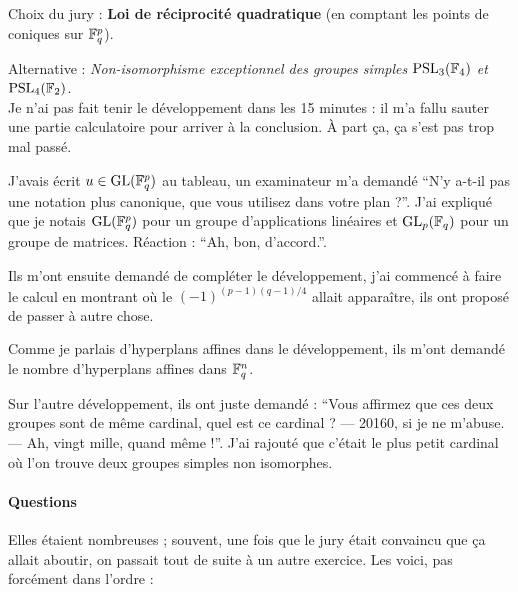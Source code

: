 \documentclass[a4paper, 11pt]{article}
\begin{document}
Choix du jury : \textbf{Loi de réciprocité quadratique} (en comptant les points de
coniques sur $\mathbb{F}_q^p$).

Alternative : \emph{Non-isomorphisme exceptionnel des groupes simples
  $\mathrm{PSL}_3(\mathbb{F}_4)$ et $\mathrm{PSL}_4(\mathbb{F}_2)$}.\\

Je n'ai pas fait tenir le développement dans les 15 minutes : il m'a fallu
sauter une partie calculatoire pour arriver à la conclusion. À part ça, ça s'est
pas trop mal passé.

J'avais écrit $u \in \mathrm{GL}(\mathbb{F}_q^p)$ au tableau, un examinateur m'a demandé
\enquote{N'y a-t-il pas une notation plus canonique, que vous utilisez dans
  votre plan ?}. J'ai expliqué que je notais $\mathrm{GL}(\mathbb{F}_q^p)$ pour un groupe
d'applications linéaires et $\mathrm{GL}_p(\mathbb{F}_q)$ pour un groupe de matrices. Réaction :
\enquote{Ah, bon, d'accord.}.

Ils m'ont ensuite demandé de compléter le développement, j'ai commencé à
faire le calcul en montrant où le $(-1)^{(p-1)(q-1)/4}$ allait apparaître, ils
ont proposé de passer à autre chose.

Comme je parlais d'hyperplans affines dans le développement, ils m'ont demandé
le nombre d'hyperplans affines dans $\mathbb{F}_q^n$.

Sur l'autre développement, ils ont juste demandé : \enquote{Vous affirmez que
  ces deux groupes sont de même cardinal, quel est ce cardinal ? --- 20160, si
  je ne m'abuse. --- Ah, vingt mille, quand même !}. J'ai rajouté que c'était le
plus petit cardinal où l'on trouve deux groupes simples non isomorphes.

\paragraph{Questions}

Elles étaient nombreuses ; souvent, une fois que le jury était convaincu que ça
allait aboutir, on passait tout de suite à un autre exercice. Les voici, pas
forcément dans l'ordre :
\end{document}

